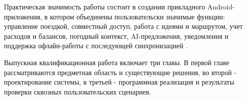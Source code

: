 Практическая значимость работы состоит в создании прикладного Android-приложения, в котором объединены пользовательски значимые функции: управление поездкой, совместный доступ, работа с идеями и маршрутом, учет расходов и балансов, погодный контекст, AI-предложения, уведомления и поддержка офлайн-работы с последующей синхронизацией .

Выпускная квалификационная работа включает три главы. В первой главе рассматриваются предметная область и существующие решения, во второй - проектирование системы, в третьей - программная реализация и результаты проверки сквозных пользовательских сценариев.
